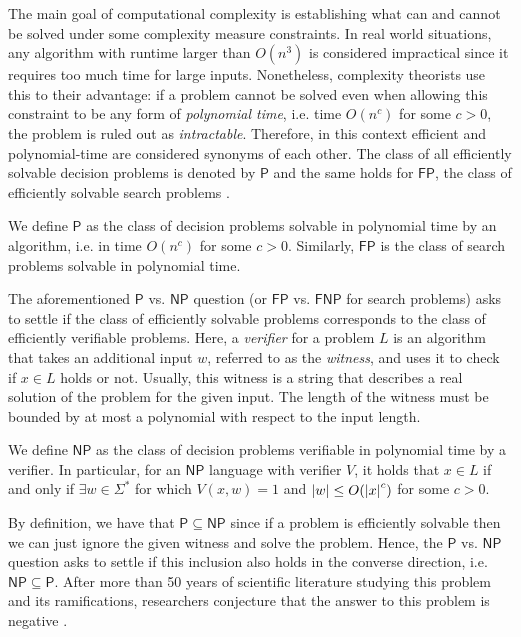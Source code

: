 The main goal of computational complexity is establishing what can and cannot be solved under some complexity measure constraints. In real world situations, any algorithm with runtime larger than $O(n^3)$ is considered impractical since it requires too much time for large inputs. Nonetheless, complexity theorists use this to their advantage: if a problem cannot be solved even when allowing this constraint to be any form of \textit{polynomial time}, i.e. time $O(n^c)$ for some $c > 0$, the problem is ruled out as \textit{intractable}. Therefore, in this context efficient and polynomial-time are considered synonyms of each other. The class of all efficiently solvable decision problems is denoted by $\mathsf{P}$ and the same holds for $\mathsf{FP}$, the class of efficiently solvable search problems \cite{cobham_p,arora_barak}.

\begin{definition}
  We define $\mathsf{P}$ as the class of decision problems solvable in polynomial time by an algorithm, i.e. in time $O(n^c)$ for some $c > 0$. Similarly, $\mathsf{FP}$ is the class of search problems solvable in polynomial time.
\end{definition}

The aforementioned $\mathsf{P}$ vs. $\mathsf{NP}$ question (or $\mathsf{FP}$ vs. $\mathsf{FNP}$ for search problems) asks to settle if the class of efficiently solvable problems corresponds to the class of efficiently verifiable problems. Here, a \textit{verifier} for a problem $L$ is an algorithm that takes an additional input $w$, referred to as the \textit{witness}, and uses it to check if $x \in L$ holds or not. Usually, this witness is a string that describes a real solution of the problem for the given input. The length of the witness must be bounded by at most a polynomial with respect to the input length.

\begin{definition}
  We define $\mathsf{NP}$ as the class of decision problems verifiable in polynomial time by a verifier. In particular, for an $\mathsf{NP}$ language with verifier $V$, it holds that $x \in L$ if and only if $\exists w \in \Sigma^*$ for which $V(x,w) = 1$ and $\left|w\right| \leq O(\left|x\right|^c)$ for some $c > 0$.
\end{definition}

By definition, we have that $\mathsf{P} \subseteq \mathsf{NP}$ since if a problem is efficiently solvable then we can just ignore the given witness and solve the problem. Hence, the $\mathsf{P}$ vs. $\mathsf{NP}$ question asks to settle if this inclusion also holds in the converse direction, i.e.  $\mathsf{NP} \subseteq \mathsf{P}$. After more than 50 years of scientific literature studying this problem and its ramifications, researchers conjecture that the answer to this problem is negative \cite{sipser_pnp,arora_barak, aaronson_survey}.

